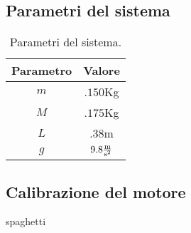 \appendix

\subsection{Parametri del sistema}\label{subsec:parametri-sistema}
\begin{table}[H]
  \centering
  \begin{tabular}[t]{cc}
    \toprule
    Parametro &Valore\\
    \midrule
    $m$ & $.150$Kg \\
    $M$ & $.175$Kg \\
    $L$ & $.38$m   \\
    $g$ & $9.8\frac {\text m}{\text {s}^2}$ \\
    \bottomrule
  \end{tabular}
  \caption{
    Parametri del sistema.
  }
  \label{tab:parametri-sistema}
\end{table}

\subsection{Calibrazione del motore}\label{subsec:calibrazione-motore}
spaghetti

